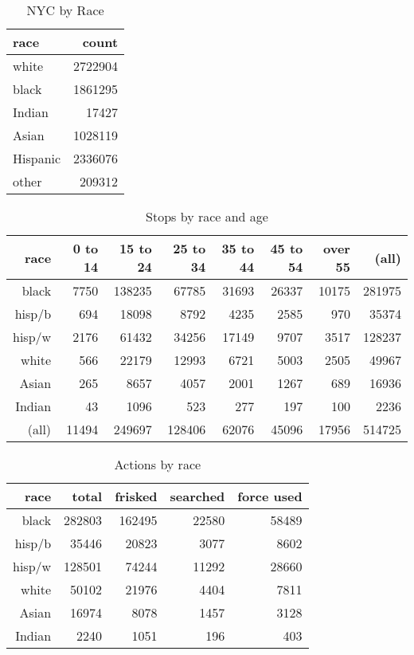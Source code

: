 \documentclass[letterpaper]{exam}
\begin{document}
  \begin{table}[H]
    \centering
    \begin{tabular}{lr}
      \toprule
      race     & count \\
      \midrule
      white    & 2722904 \\
      black    & 1861295 \\
      Indian   & 17427 \\
      Asian    & 1028119 \\
      Hispanic & 2336076 \\
      other    & 209312 \\
      \bottomrule
    \end{tabular}
    \caption{NYC by Race}
  \end{table}

  \begin{table}[H]
    \centering
    \begin{tabular}{rrrrrrrr}
      \toprule
       race    & 0 to 14 & 15 to 24 & 25 to 34 & 35 to 44 & 45 to 54 & over 55 & (all) \\
      \midrule
      black    & 7750    & 138235   & 67785    & 31693    & 26337    & 10175   & 281975 \\
      hisp/b   & 694     & 18098    & 8792     & 4235     & 2585     & 970     & 35374 \\
      hisp/w   & 2176    & 61432    & 34256    & 17149    & 9707     & 3517    & 128237 \\
      white    & 566     & 22179    & 12993    & 6721     & 5003     & 2505    & 49967 \\
      Asian    & 265     & 8657     & 4057     & 2001     & 1267     & 689     & 16936 \\
      Indian   & 43      & 1096     & 523      & 277      & 197      & 100     & 2236 \\
      (all)    & 11494   & 249697   & 128406   & 62076    & 45096    & 17956   & 514725 \\
      \bottomrule
    \end{tabular}
    \caption{Stops by race and age}
  \end{table}

  \begin{table}[H]
    \centering
    \begin{tabular}{rrrrr}
      \toprule
      race     & total  & frisked & searched & force used \\
      \midrule
      black    & 282803 & 162495  & 22580    & 58489 \\
      hisp/b   & 35446  & 20823   & 3077     & 8602 \\
      hisp/w   & 128501 & 74244   & 11292    & 28660 \\
      white    & 50102  & 21976   & 4404     & 7811 \\
      Asian    & 16974  & 8078    & 1457     & 3128 \\
      Indian   & 2240   & 1051    & 196      & 403 \\
      \bottomrule
    \end{tabular}
    \caption{Actions by race}
  \end{table}
\end{document}
